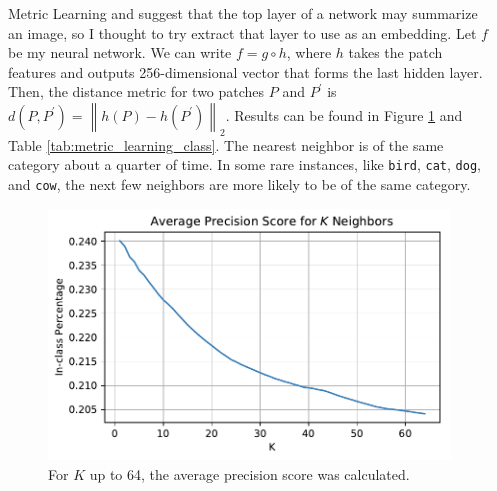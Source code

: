 \documentclass[final]{beamer}
\newlength{\onecolwid}
\newlength{\twocolwid}
\begin{document}
\begin{frame}[t]
\begin{columns}[t]
\begin{column}{\twocolwid}
\begin{columns}[t,totalwidth=\twocolwid]
\begin{column}{\onecolwid}
\begin{block}{Metric Learning}
  \cite{neural_codes} and \cite{imagenet} suggest that the top layer of a
  network may summarize an image, so I thought to try extract that layer to use
  as an embedding. Let $f$ be my neural network. We can write $f = g \circ h$,
  where $h$ takes the patch features and outputs 256-dimensional vector that
  forms the last hidden layer. Then, the distance metric for two patches $P$ and
  $P^\prime$ is
  $d\left(P,P^\prime\right) = \left\lVert h\left(P\right) -
    h\left(P^\prime\right)\right\rVert_2$. Results can be found in Figure
  \ref{fig:metric_average_precision_score} and Table
  \ref{tab:metric_learning_class}. The nearest neighbor is of the same category
  about a quarter of time. In some rare instances, like \texttt{bird},
  \texttt{cat}, \texttt{dog}, and \texttt{cow}, the next few neighbors are more
  likely to be of the same category.
  
  \begin{figure}
    \centering
    \includegraphics[scale=1.5]{../project/metric_learning/metric_average_precision_score.pdf}
    \caption{For $K$ up to 64, the average precision score was calculated.}
    \label{fig:metric_average_precision_score}
  \end{figure}
  
\end{block}

\end{column} %

\end{columns} %

\end{column} %

\begin{column}{\onecolwid} %



\end{column}
\end{columns}
\end{frame}
\end{document}
